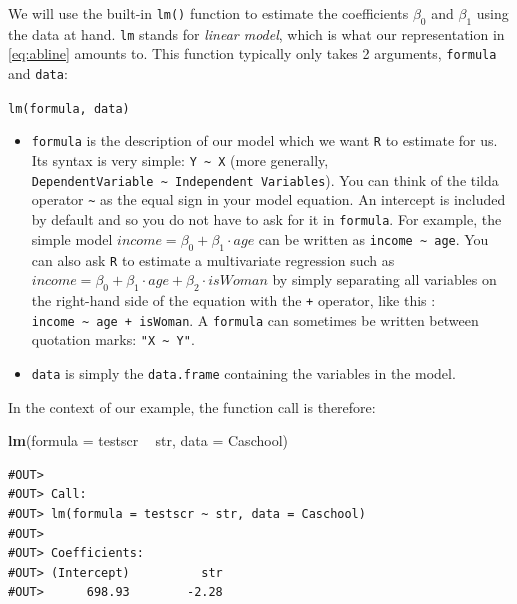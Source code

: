 \documentclass[]{book}
\newenvironment{Shaded}{\begin{snugshade}}{\end{snugshade}}
\newcommand{\KeywordTok}[1]{\textcolor[rgb]{0.13,0.29,0.53}{\textbf{#1}}}
\newcommand{\DataTypeTok}[1]{\textcolor[rgb]{0.13,0.29,0.53}{#1}}
\newcommand{\StringTok}[1]{\textcolor[rgb]{0.31,0.60,0.02}{#1}}
\newcommand{\OperatorTok}[1]{\textcolor[rgb]{0.81,0.36,0.00}{\textbf{#1}}}
\newcommand{\NormalTok}[1]{#1}
\theoremstyle{definition}
\theoremstyle{definition}
\theoremstyle{definition}
\theoremstyle{remark}
\begin{document}
We will use the built-in \texttt{lm()} function to estimate the
coefficients \(\beta_0\) and \(\beta_1\) using the data at hand.
\texttt{lm} stands for \emph{linear model}, which is what our
representation in \eqref{eq:abline} amounts to. This function typically
only takes 2 arguments, \texttt{formula} and \texttt{data}:

\texttt{lm(formula,\ data)}

\begin{itemize}
\item
  \texttt{formula} is the description of our model which we want
  \texttt{R} to estimate for us. Its syntax is very simple:
  \texttt{Y\ \textasciitilde{}\ X} (more generally,
  \texttt{DependentVariable\ \textasciitilde{}\ Independent\ Variables}).
  You can think of the tilda operator \texttt{\textasciitilde{}} as the
  equal sign in your model equation. An intercept is included by default
  and so you do not have to ask for it in \texttt{formula}. For example,
  the simple model \(income = \beta_0 + \beta_1 \cdot age\) can be
  written as \texttt{income\ \textasciitilde{}\ age}. You can also ask
  \texttt{R} to estimate a multivariate regression such as
  \(income = \beta_0 + \beta_1 \cdot age + \beta_2 \cdot isWoman\) by
  simply separating all variables on the right-hand side of the equation
  with the \texttt{+} operator, like this :
  \texttt{income\ \textasciitilde{}\ age\ +\ isWoman}. A
  \texttt{formula} can sometimes be written between quotation marks:
  \texttt{"X\ \textasciitilde{}\ Y"}.
\item
  \texttt{data} is simply the \texttt{data.frame} containing the
  variables in the model.
\end{itemize}

In the context of our example, the function call is therefore:

\begin{Shaded}
\begin{Highlighting}[]
\KeywordTok{lm}\NormalTok{(}\DataTypeTok{formula =}\NormalTok{ testscr }\OperatorTok{~}\StringTok{ }\NormalTok{str, }\DataTypeTok{data =}\NormalTok{ Caschool)}
\end{Highlighting}
\end{Shaded}

\begin{verbatim}
#OUT> 
#OUT> Call:
#OUT> lm(formula = testscr ~ str, data = Caschool)
#OUT> 
#OUT> Coefficients:
#OUT> (Intercept)          str  
#OUT>      698.93        -2.28
\end{verbatim}
\end{document}

